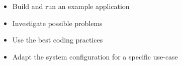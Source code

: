 {
  \begin{itemize}
    \item Build and run an example application
    \item Investigate possible problems
    \item Use the best coding practices
    \item Adapt the system configuration for a specific use-case
  \end{itemize}
}
